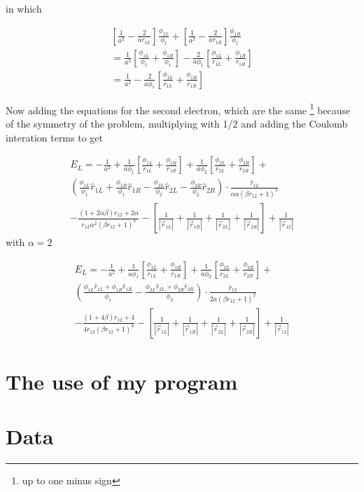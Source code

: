 \documentclass{article}
\begin{document}
in which 

\begin{multline}
   \left[\frac{1}{a^2}-\frac{2}{a{r}_{1L}} \right] \frac{\phi_{1L}}{\phi_1} + \left[\frac{1}{a^2} - \frac{2}{a{r}_{1R}} \right] \frac{\phi_{1R}}{\phi_1}   \\ = \frac{1}{a^2} \left[ \frac{\phi_{1L}}{\phi_1} + \frac{\phi_{1R}}{\phi_1} \right]-\frac{2}{a\phi_1}\left[ \frac{\phi_{1L}}{r_{1L}}+\frac{\phi_{1R}}{r_{1R}} \right] \\ = \frac{1}{a^2} -\frac{2}{a\phi_1}\left[ \frac{\phi_{1L}}{r_{1L}}+\frac{\phi_{1R}}{r_{1R}} \right]
\end{multline}

Now adding the equations for the second electron, which are the same \footnote{up to one minus sign} because of the symmetry of the problem, multiplying with 1/2 and adding the Coulomb interation terms to get

\begin{multline}%
 E_L = -\frac{1}{a^2} +\frac{1}{a\phi_1}\left[ \frac{\phi_{1L}}{r_{1L}}+\frac{\phi_{1R}}{r_{1R}} \right] + \frac{1}{a\phi_2} \left[ \frac{\phi_{2L}}{r_{2L}}+\frac{\phi_{2R}}{r_{2R}}\right]
 + \\ \left(  \frac{\phi_{1L}}{\phi_1}\hat{r}_{1L} +\frac{\phi_{1R}}{\phi_1}\hat{r}_{1R}   -   \frac{\phi_{2L}}{\phi_2}\hat{r}_{2L} -\frac{\phi_{2R}}{\phi_2}\hat{r}_{2R}     \right)  \cdot \frac{\hat{r}_{12}}{\alpha a(\beta r_{12}+1)^2} \\
  -   \frac{(1+2\alpha \beta) r_{12} + 2\alpha}{r_{12}\alpha^2(\beta r_{12}+1)^4} 
  - \left[ \frac{1}{|\vec{r}_{1L}|} +\frac{1}{|\vec{r}_{1R}|}+\frac{1}{|\vec{r}_{2L}|}+\frac{1}{|\vec{r}_{2R}|} \right] +\frac{1}{\left| \vec{r}_{12} \right|} 
\end{multline}
with $\alpha=2$


 \begin{multline}
 E_L = -\frac{1}{a^2} + \frac{1}{a\phi_1}\left[ \frac{\phi_{1L}}{r_{1L}}+\frac{\phi_{1R}}{r_{1R}} \right] + \frac{1}{a\phi_2} \left[ \frac{\phi_{2L}}{r_{2L}}+\frac{\phi_{2R}}{r_{2R}}\right]
 + \\ \left(  \frac{\phi_{1L}\hat{r}_{1L}+\phi_{1R}\hat{r}_{1R}}{\phi_1}   -    \frac{\phi_{2L}\hat{r}_{2L}+\phi_{2R}\hat{r}_{2R}}{\phi_2}     \right) \cdot \frac{\hat{r}_{12}}{2 a(\beta r_{12}+1)^2} \\
  -   \frac{(1+4 \beta) r_{12} + 4}{4r_{12}(\beta r_{12}+1)^4} 
  - \left[ \frac{1}{|\vec{r}_{1L}|} +\frac{1}{|\vec{r}_{1R}|}+\frac{1}{|\vec{r}_{2L}|}+\frac{1}{|\vec{r}_{2R}|} \right] +\frac{1}{\left| \vec{r}_{12} \right|} 
\end{multline}



\section{The use of my program}


\section{Data}
\end{document}
